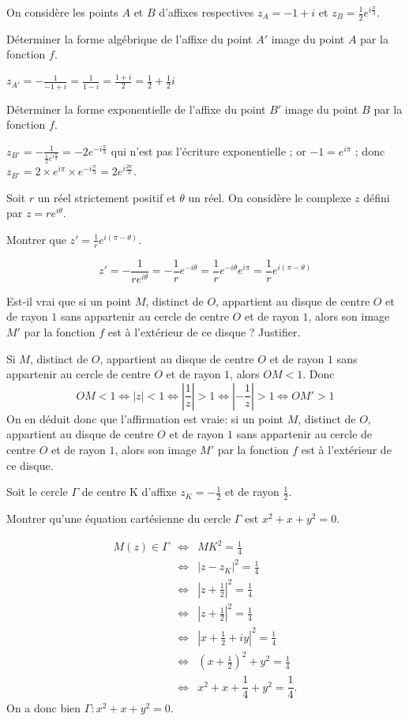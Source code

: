 \documentclass[a4paper,11pt]{article} %
\numberwithin{equation}{section} %
\numberwithin{figure}{section} %
\theoremstyle{plain} %
\theoremstyle{definition} %
\theoremstyle{remark} %
\begin{document}
On considère les points $A$ et $B$ d'affixes respectives $z_{A} = -1 + i$ et $z_{B} = \frac12 e^{i\frac{\pi}{3}}$.


Déterminer la forme algébrique de l'affixe du point $A'$ image du point $A$ par la fonction $f$.


$z_{A'} = -\frac{1}{-1 + i} = \frac{1}{1 - i} = \frac{1 + i}{2} = \frac12 + \frac12 i$


Déterminer la forme exponentielle de l'affixe du point $B'$ image du point $B$ par la fonction $f$.


$z_{B'} = -\frac{1}{\frac12 e^{i\frac{\pi}{3}}} = -2 e^{-i\frac{\pi}{3}}$ qui n'est pas l'écriture exponentielle ; or $- 1 = e^{i\pi}$ ; donc $z_{B'} = 2 \times e^{i\pi} \times e^{-i\frac{\pi}{3}} = 2 e^{i\frac{2\pi}{3}}$. 


Soit $r$ un réel strictement positif et $\theta$ un réel. On considère le complexe $z$ défini par $z = r e^{i\theta}$.


Montrer que $z' = \frac{1}{r} e^{i \left(\pi - \theta\right)}$. 


$$z' = -\frac{1}{r e^{i\theta}} = -\frac{1}{r} e^{-i\theta} = \frac{1}{r} e^{-i\theta} e^{i\pi} = \frac{1}{r} e^{i(\pi - \theta)}$$


Est-il vrai que si un point $M$, distinct de $O$, appartient au disque de centre $O$ et de rayon $1$ sans appartenir au cercle de centre $O$ et de rayon $1$, alors son image $M'$ par la fonction $f$ est à l'extérieur de ce disque ? Justifier. 


Si $M$, distinct de $O$, appartient au disque de centre $O$ et de rayon $1$ sans appartenir au cercle de centre $O$ et de rayon $1$, alors $OM < 1$. Donc $$
OM < 1 
\Leftrightarrow \left| z \right| < 1 
\Leftrightarrow \left| \dfrac{1}{z} \right| > 1
\Leftrightarrow \left| -\dfrac{1}{z} \right| >1 
\Leftrightarrow OM' > 1
$$ 
On en déduit donc que l'affirmation est vraie: si un point $M$, distinct de $O$, appartient au disque de centre $O$ et de rayon $1$ sans appartenir au cercle de centre $O$ et de rayon $1$, alors son image $M'$ par la fonction $f$ est à l'extérieur de ce disque.


Soit le cercle $\Gamma$ de centre K d'affixe $z_{K} = -\frac{1}{2}$ et de rayon $\frac12$.


Montrer qu'une équation cartésienne du cercle $\Gamma$ est $x^2 + x + y^2 = 0$.


\begin{eqnarray*} 
M(z) \in \Gamma 
&\Leftrightarrow& MK^2 = \frac14 \\ 
&\Leftrightarrow& \left| z - z_K \right|^2 = \frac14 \\
&\Leftrightarrow& \left|z+\frac12 \right|^2 =\frac14 \\
&\Leftrightarrow& \left|z+\frac12 \right|^2 =\frac14 \\
&\Leftrightarrow& \left|x+\frac12 + i y\right|^2 =\frac14 \\
&\Leftrightarrow& \left( x+\frac12\right) ^2 +y^2 =\frac14 \\
&\Leftrightarrow& x^2+x+\dfrac14 +y^2 =\dfrac14.
\end{eqnarray*}
On a donc bien $\Gamma : x^2 + x + y^2 = 0$.	
\end{document}
